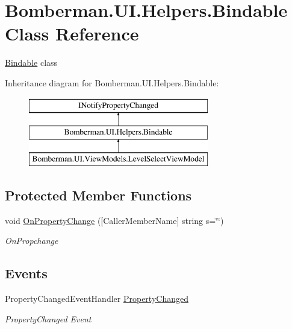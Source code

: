 \hypertarget{class_bomberman_1_1_u_i_1_1_helpers_1_1_bindable}{}\section{Bomberman.\+U\+I.\+Helpers.\+Bindable Class Reference}
\label{class_bomberman_1_1_u_i_1_1_helpers_1_1_bindable}


\mbox{\hyperlink{class_bomberman_1_1_u_i_1_1_helpers_1_1_bindable}{Bindable}} class  


Inheritance diagram for Bomberman.\+U\+I.\+Helpers.\+Bindable\+:\begin{figure}[H]
\begin{center}
\leavevmode
\includegraphics[height=3.000000cm]{class_bomberman_1_1_u_i_1_1_helpers_1_1_bindable}
\end{center}
\end{figure}
\subsection*{Protected Member Functions}
\begin{DoxyCompactItemize}
\item 
void \mbox{\hyperlink{class_bomberman_1_1_u_i_1_1_helpers_1_1_bindable_ade4dd77c3c943a17ff2a4ac4dd4ee549}{On\+Property\+Change}} (\mbox{[}Caller\+Member\+Name\mbox{]} string s=\char`\"{}\char`\"{})
\begin{DoxyCompactList}\small\item\em On\+Propchange \end{DoxyCompactList}\end{DoxyCompactItemize}
\subsection*{Events}
\begin{DoxyCompactItemize}
\item 
Property\+Changed\+Event\+Handler \mbox{\hyperlink{class_bomberman_1_1_u_i_1_1_helpers_1_1_bindable_aff4f362447fa172bbd5c26610d95239e}{Property\+Changed}}
\begin{DoxyCompactList}\small\item\em Property\+Changed Event \end{DoxyCompactList}\end{DoxyCompactItemize}


